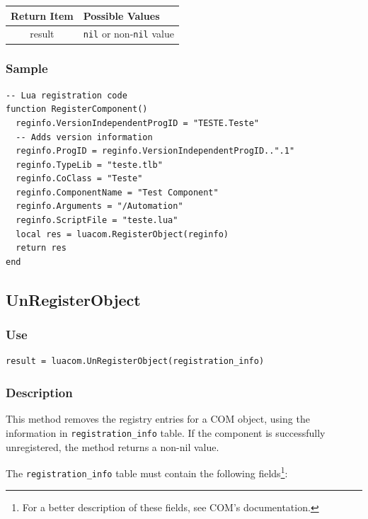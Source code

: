 \documentclass[11pt,a4paper,english]{report}
\begin{document}
\begin{tabular}{|c|p{4cm}|}
\hline
\bf Return Item & \bf Possible Values \\ \hline \hline
result  & \texttt{nil} or non-\texttt{nil} value\\ \hline
\end{tabular}

\subsubsection*{Sample}

\begin{verbatim}
-- Lua registration code
function RegisterComponent()
  reginfo.VersionIndependentProgID = "TESTE.Teste"
  -- Adds version information
  reginfo.ProgID = reginfo.VersionIndependentProgID..".1"
  reginfo.TypeLib = "teste.tlb"
  reginfo.CoClass = "Teste"
  reginfo.ComponentName = "Test Component"
  reginfo.Arguments = "/Automation"
  reginfo.ScriptFile = "teste.lua"
  local res = luacom.RegisterObject(reginfo)
  return res
end
\end{verbatim}

\subsection*{UnRegisterObject}

\subsubsection*{Use}

\begin{verbatim}
result = luacom.UnRegisterObject(registration_info)
\end{verbatim}

\subsubsection*{Description}
This method removes the registry entries for a COM object,
using the information in \texttt{registration\_info} table. If the
component is successfully unregistered, the method returns a non-nil
value.

The \texttt{registration\_info} table must contain the following
fields\footnote{For a better description of these fields, see COM's
documentation.}:
\end{document}
